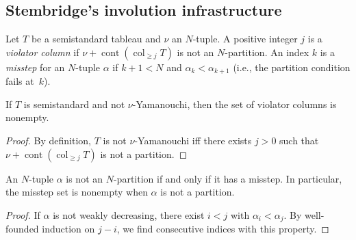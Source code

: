 \subsection{Stembridge's involution infrastructure}

\begin{definition}
\label{def.sf.stemb-violator-misstep}
\leanhelper
\leanok
Let $T$ be a semistandard tableau and $\nu$ an $N$-tuple. A positive integer
$j$ is a \emph{violator column} if $\nu + \operatorname{cont}(\operatorname{col}_{\geq j} T)$
is not an $N$-partition. An index $k$ is a \emph{misstep} for an $N$-tuple
$\alpha$ if $k + 1 < N$ and $\alpha_k < \alpha_{k+1}$ (i.e., the partition
condition fails at~$k$).
\end{definition}

\begin{lemma}
\label{lem.sf.stemb-violator-nonempty}
\leanhelper
\leanok
If $T$ is semistandard and not $\nu$-Yamanouchi, then the set of violator
columns is nonempty.
\end{lemma}

\begin{proof}
\leanok
By definition, $T$ is not $\nu$-Yamanouchi iff there exists $j > 0$ such that
$\nu + \operatorname{cont}(\operatorname{col}_{\geq j} T)$ is not a partition.
\end{proof}

\begin{lemma}
\label{lem.sf.stemb-misstep-nonempty}
\leanhelper
\leanok
An $N$-tuple $\alpha$ is not an $N$-partition if and only if it has a misstep.
In particular, the misstep set is nonempty when $\alpha$ is not a partition.
\end{lemma}

\begin{proof}
\leanok
If $\alpha$ is not weakly decreasing, there exist $i < j$ with
$\alpha_i < \alpha_j$. By well-founded induction on $j - i$, we find
consecutive indices with this property.
\end{proof}

